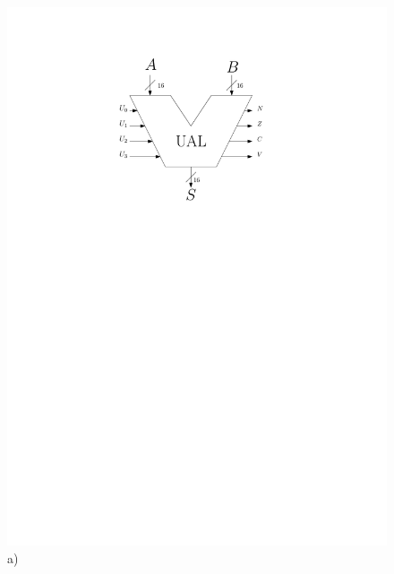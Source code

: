 \begin{figure}[htbp]
   \begin{minipage}[c]{.4\linewidth}
\includegraphics[width=\linewidth]{Figs/ual.pdf}\\\centering a)
   \end{minipage} \hfill
   \begin{minipage}[c]{.58\linewidth}

\end{minipage}
\end{figure}
